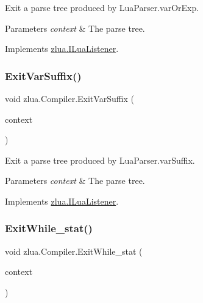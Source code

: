 Exit a parse tree produced by Lua\+Parser.\+var\+Or\+Exp. 


\begin{DoxyParams}{Parameters}
{\em context} & The parse tree.\\
\hline
\end{DoxyParams}


Implements \mbox{\hyperlink{interfacezlua_1_1_i_lua_listener_a0c463bdafad827e9a749f5276a7bb7df}{zlua.\+I\+Lua\+Listener}}.

\mbox{\label{classzlua_1_1_compiler_aae7819794cccd6cfa7ccedcdb6c69a78}} 
\subsubsection{\texorpdfstring{Exit\+Var\+Suffix()}{ExitVarSuffix()}}
{\footnotesize\ttfamily void zlua.\+Compiler.\+Exit\+Var\+Suffix (\begin{DoxyParamCaption}\item[{\mbox{[}\+Not\+Null\mbox{]} \mbox{\hyperlink{classzlua_1_1_lua_parser_1_1_var_suffix_context}{Lua\+Parser.\+Var\+Suffix\+Context}}}]{context }\end{DoxyParamCaption})}



Exit a parse tree produced by Lua\+Parser.\+var\+Suffix. 


\begin{DoxyParams}{Parameters}
{\em context} & The parse tree.\\
\hline
\end{DoxyParams}


Implements \mbox{\hyperlink{interfacezlua_1_1_i_lua_listener_a6445ba070fc2f85e9a4ca3caf3a75d0b}{zlua.\+I\+Lua\+Listener}}.

\mbox{\label{classzlua_1_1_compiler_ab9803e477ce65ab3eec9f6013082b4ed}} 
\subsubsection{\texorpdfstring{Exit\+While\+\_\+stat()}{ExitWhile\_stat()}}
{\footnotesize\ttfamily void zlua.\+Compiler.\+Exit\+While\+\_\+stat (\begin{DoxyParamCaption}\item[{\mbox{[}\+Not\+Null\mbox{]} \mbox{\hyperlink{classzlua_1_1_lua_parser_1_1_while__stat_context}{Lua\+Parser.\+While\+\_\+stat\+Context}}}]{context }\end{DoxyParamCaption})}




